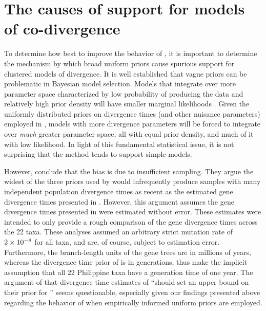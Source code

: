 \section*{The causes of support for models of co-divergence}
To determine how best to improve the behavior of \msb, it is important to
determine the mechanism by which broad uniform priors cause spurious support
for clustered models of divergence.
It is well established that vague priors can be problematic in Bayesian model
selection.
Models that integrate over more parameter space characterized by low
probability of producing the data and relatively high prior density will have
smaller marginal likelihoods \citep{Jeffreys1935,Lindley1957}.
Given the uniformly distributed priors on divergence times (and other nuisance
parameters) employed in \msb, models with more divergence parameters will be
forced to integrate over \emph{much} greater parameter space, all with equal
prior density, and much of it with low likelihood.
In light of this fundamental statistical issue, it is not surprising that the
method tends to support simple models.

However, \citet{Hickerson2013} conclude that the bias is due to insufficient
sampling.
They argue the widest of the three priors used by \citet{Oaks2012} would
infrequently produce samples with many independent population divergence times
as recent as the estimated gene divergence times presented in \citet{Oaks2012}.
However, this argument assumes the gene divergence times presented in
\citet{Oaks2012} were estimated without error.
These estimates were intended to only provide a rough comparison of the
gene divergence times across the 22 taxa.
These analyses assumed an arbitrary strict mutation rate of $2\times 10^{-8}$ for all
taxa, and are, of course, subject to estimation error.
Furthermore, the branch-length units of the gene trees are in millions of
years, whereas the divergence time prior of \msb is in generations, thus
\citet{Hickerson2013} make the implicit assumption that all 22 Philippine taxa
have a generation time of one year.
The argument of \citet{Hickerson2013} that divergence time estimates of
\citet{Oaks2012} ``should set an upper bound on their prior for \divt{}'' seems
questionable, especially given our findings presented above regarding the
behavior of \msb when empirically informed uniform priors are employed.

